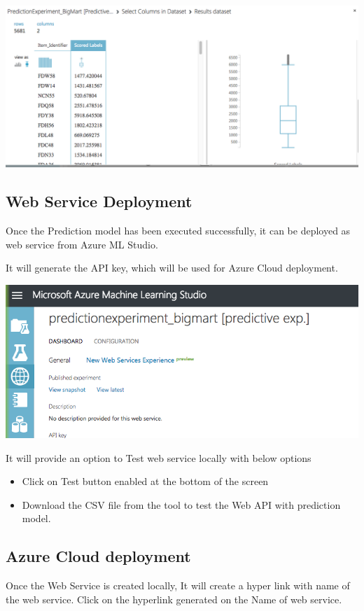 \includegraphics[width=\columnwidth]
{Images/mlstudio/PredictionOutputfromModel.png}


\subsection{Web Service Deployment}
Once the Prediction model has been executed successfully, it can be deployed 
as web service from Azure ML Studio.

It will generate the API key, which will be used for Azure Cloud deployment.


\includegraphics[width=\columnwidth]{Images/mlstudio/Webservicedeploy.png}


It will provide an option to Test web service locally with below options
\begin{itemize}
\item Click on Test button enabled at the bottom of the screen
\item Download the CSV file from the tool to test the Web API 
with prediction model.
\end{itemize}

\subsection{Azure Cloud deployment}
Once the Web Service is created locally, It will create a hyper link with 
name of the web service. 
Click on the hyperlink generated on the Name of web service.

